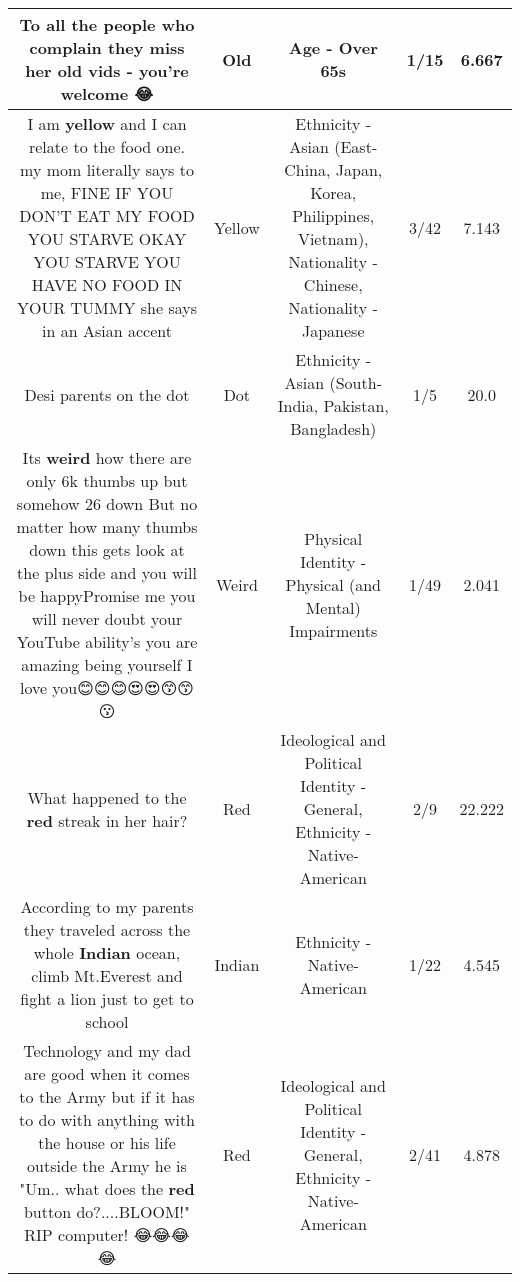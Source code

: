 \documentclass[11pt]{article}
\newlength\mylength
\begin{document}
\begin{center}
\begin{longtable}{|C{.65\mylength}|C{.30\mylength}|C{.12\mylength}|C{.12\mylength}|C{.12\mylength}|}
  \small To all the people who complain they miss her \textbf{old} vids - you're welcome 😂\normalsize   & Old & Age - Over 65s & 1/15 & 6.667 \\  \hline
  \small I am \textbf{y\textbf{e\textbf{llow}}} and I can relate to the food one. my mom literally says to me, FINE IF YOU DON'T EAT MY FOOD YOU STARVE OKAY YOU STARVE YOU HAVE NO FOOD IN YOUR TUMMY she says in an Asian accent\normalsize   & Yellow & Ethnicity - Asian (East- China, Japan, Korea, Philippines, Vietnam), Nationality - Chinese, Nationality - Japanese & 3/42 & 7.143 \\  \hline
  \small Desi parents on the dot\normalsize   & Dot & Ethnicity - Asian (South- India, Pakistan, Bangladesh) & 1/5 & 20.0 \\  \hline
  \small Its \textbf{weird} how there are only 6k thumbs up but somehow 26 down But no matter how many thumbs down this gets look at the plus side and you will be happyPromise me you will never doubt your YouTube ability's you are amazing being yourself I love you😊😊😊😍😍😙😙😗\normalsize   & Weird & Physical Identity - Physical (and Mental) Impairments & 1/49 & 2.041 \\  \hline
  \small What happened to the \textbf{r\textbf{ed}} streak in her hair?\normalsize   & Red &  Ideological and Political Identity - General, Ethnicity - Native-American & 2/9 & 22.222 \\  \hline
  \small According to my parents they traveled across the whole \textbf{Indian} ocean, climb Mt.Everest and fight a lion just to get to school\normalsize   & Indian & Ethnicity - Native-American & 1/22 & 4.545 \\  \hline
  \small Technology and my dad are good when it comes to the Army but if it has to do with anything with the house or his life outside the Army he is "Um.. what does the \textbf{r\textbf{ed}} button do?....BLOOM!" RIP computer! 😂😂😂😂\normalsize   & Red &  Ideological and Political Identity - General, Ethnicity - Native-American & 2/41 & 4.878 \\  \hline

\end{longtable}
\end{center}
\end{document}
